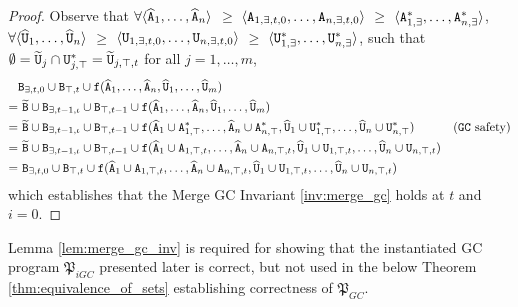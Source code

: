 \begin{proof}
Observe that $\forall \langle \widehat{\tt{A}}_1, \dots, \widehat{\tt{A}}_n \rangle$ $\geq$ $\langle \tt{A}_{1,\exists,t,0}, \dots, \tt{A}_{n,\exists,t,0} \rangle$ $\geq$ $\langle \tt{A}_{1,\exists}^*, \dots, \tt{A}_{n,\exists}^* \rangle$,
$\forall \langle \widehat{\tt{U}}_1, \dots, \widehat{\tt{U}}_n \rangle$ $\geq$ $\langle \tt{U}_{1,\exists,t,0}, \dots, \tt{U}_{n,\exists,t,0} \rangle$ $\geq$ $\langle \tt{U}_{1,\exists}^*, \dots, \tt{U}_{n,\exists}^* \rangle$,
such that $\emptyset = \widetilde{\tt{U}}_j \cap \tt{U}_{j,\top}^* = \widetilde{\tt{U}}_{j,\top,t}$ for all $j = 1,\dots,m$,
\begin{align*}
&
\tt{B}_{\exists,t,0} \cup \tt{B}_{\top,t}
\cup \tt{f}(\widehat{\tt{A}}_1, \dots, \widehat{\tt{A}}_n, \widehat{\tt{U}}_1, \dots, \widehat{\tt{U}}_m)
\\
=&~
\widetilde{\tt{B}} \cup \tt{B}_{\exists,t-1,\iota} \cup \tt{B}_{\top,t-1}
\cup \tt{f}(\widehat{\tt{A}}_1, \dots, \widehat{\tt{A}}_n, \widehat{\tt{U}}_1, \dots, \widehat{\tt{U}}_m)
\\
=&~
\widetilde{\tt{B}} \cup \tt{B}_{\exists,t-1,\iota} \cup \tt{B}_{\top,t-1}
\cup \tt{f}(
\widehat{\tt{A}}_1 \cup \tt{A}_{1,\top}^*, \dots, \widehat{\tt{A}}_n \cup \tt{A}_{n,\top}^*,
\widehat{\tt{U}}_1 \cup \tt{U}_{1,\top}^*, \dots, \widehat{\tt{U}}_n \cup \tt{U}_{n,\top}^*)
&\text{(\tt{GC} safety)}
\\
=&~
\widetilde{\tt{B}} \cup \tt{B}_{\exists,t-1,\iota} \cup \tt{B}_{\top,t-1}
\cup \tt{f}(
\widehat{\tt{A}}_1 \cup \tt{A}_{1,\top,t}, \dots, \widehat{\tt{A}}_n \cup \tt{A}_{n,\top,t},
\widehat{\tt{U}}_1 \cup \tt{U}_{1,\top,t}, \dots, \widehat{\tt{U}}_n \cup \tt{U}_{n,\top,t})
\\
=&~
\tt{B}_{\exists,t,0} \cup \tt{B}_{\top,t}
\cup \tt{f}(
\widehat{\tt{A}}_1 \cup \tt{A}_{1,\top,t}, \dots, \widehat{\tt{A}}_n \cup \tt{A}_{n,\top,t},
\widehat{\tt{U}}_1 \cup \tt{U}_{1,\top,t}, \dots, \widehat{\tt{U}}_n \cup \tt{U}_{n,\top,t})
\end{align*}
which establishes that the Merge GC Invariant \ref{inv:merge_gc} holds at $t$ and $i=0$.
\end{proof}

\begin{rmk}
Lemma \ref{lem:merge_gc_inv} is required for showing that the instantiated GC program $\mathfrak{P}_{iGC}$ presented later is correct, but not used in the below Theorem \ref{thm:equivalence_of_sets} establishing correctness of $\mathfrak{P}_{GC}$.
\end{rmk}




